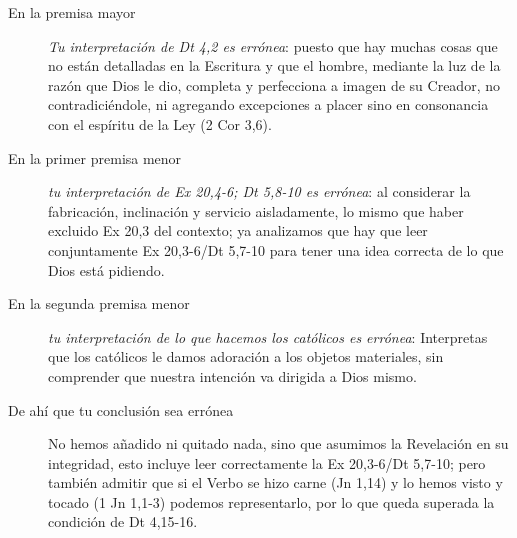 \documentclass{article}
\begin{document}
\begin{description}
\item [En la premisa mayor] \emph{Tu interpretación de Dt 4,2 es errónea}: puesto que hay muchas cosas que no están detalladas en la Escritura y que el hombre, mediante la luz de la razón que Dios le dio, completa y perfecciona a imagen de su Creador, no contradiciéndole, ni agregando excepciones a placer sino en consonancia con el espíritu de la Ley (2 Cor 3,6).

\item [En la primer premisa menor] \emph{tu interpretación de Ex 20,4-6; Dt 5,8-10 es errónea}: al considerar la fabricación, inclinación y servicio aisladamente, lo mismo que haber excluido Ex 20,3 del contexto; ya analizamos que hay que leer conjuntamente Ex 20,3-6/Dt 5,7-10 para tener una idea correcta de lo que Dios está pidiendo.

\item [En la segunda premisa menor] \emph{tu interpretación de lo que hacemos los católicos es errónea}: Interpretas que los católicos le damos adoración a los objetos materiales, sin comprender que nuestra intención va dirigida a Dios mismo.

\item[De ahí que tu conclusión sea errónea] No hemos añadido ni quitado nada, sino que asumimos la Revelación en su integridad, esto incluye leer correctamente la Ex 20,3-6/Dt 5,7-10; pero también admitir que si el Verbo se hizo carne (Jn 1,14) y lo hemos visto y tocado (1 Jn 1,1-3) podemos representarlo, por lo que queda superada la condición de Dt 4,15-16.
\end{description}



\end{document}
